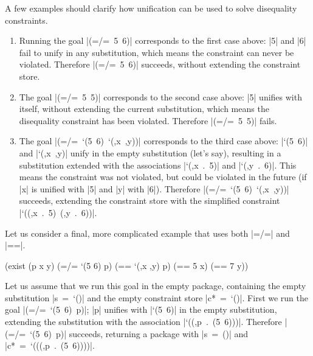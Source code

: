 A few examples should clarify how unification can be used to solve
disequality constraints.  

\begin{enumerate}
\item Running the goal \mbox{\scheme|(=/= 5 6)|} corresponds to the
  first case above: \scheme|5| and \scheme|6| fail to unify in any
  substitution, which means the constraint can never be violated.
  Therefore \mbox{\scheme|(=/= 5 6)|} succeeds, without extending the
  constraint store.

\item The goal \mbox{\scheme|(=/= 5 5)|} corresponds to the second
  case above: \scheme|5| unifies with itself, without extending the
  current substitution, which means the disequality constraint has
  been violated.  Therefore \mbox{\scheme|(=/= 5 5)|} fails.

\item The goal \mbox{\scheme|(=/= `(5 6) `(,x ,y))|} corresponds to
  the third case above: \mbox{\scheme|`(5 6)|} and \mbox{\scheme|`(,x ,y)|} 
  unify in the empty substitution (let's say), resulting in a
  substitution extended with the associations \mbox{\scheme|`(,x . 5)|} 
  and \mbox{\scheme|`(,y . 6)|}.  This means the
  constraint was not violated, but could be violated in the future (if 
  \scheme|x| is unified with \scheme|5| and \scheme|y| with \scheme|6|).
  Therefore \mbox{\scheme|(=/= `(5 6) `(,x ,y))|} succeeds, extending the 
  constraint store with the simplified constraint \mbox{\scheme|`((,x . 5) (,y . 6))|}.
\end{enumerate}


Let us consider a final, more complicated example that uses both
\scheme|=/=| and \scheme|==|.

\schemedisplayspace
\begin{schemedisplay}
(exist (p x y)
  (=/= `(5 6) p)
  (== `(,x ,y) p)
  (== 5 x)
  (== 7 y))
\end{schemedisplay}

\noindent Let us assume that we run this goal in the empty package, containing
the empty substitution \mbox{\scheme|s = `()|} and the empty constraint
store \mbox{\scheme|c* = `()|}.  First we run the goal \mbox{\scheme|(=/= `(5 6) p)|};
\mbox{\scheme|p|} unifies with
\mbox{\scheme|`(5 6)|} in the empty substitution, extending the substitution with the association
\mbox{\scheme|`((,p . (5 6)))|}.  Therefore \mbox{\scheme|(=/= `(5 6) p)|} succeeds, returning a
package with \mbox{\scheme|s = ()|} and \mbox{\scheme|c* =  `(((,p . (5 6))))|}.

